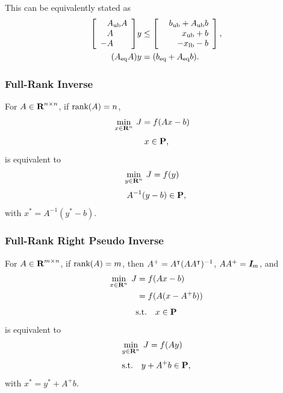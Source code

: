 \documentclass{article}
\begin{document}
        This can be equivalently stated as
    \begin{align*}
        \left[\begin{array}{l}
            \minus A_\ub A
            \\
            \minus A
            \\
            -A
        \end{array}\right]
        &y\leq
        \left[\begin{array}{r}
            \minus b_\ub+A_\ub b
            \\
            \minus x_\ub +b
            \\
            -x_\lb-b
        \end{array}\right],\\
        (A_\eq A)&y = (b_\eq+A_\eq b).
    \end{align*}

\subsubsection{Full-Rank Inverse}

    For $A\in\textbf{R}^{n\times n}$, if $\text{rank}(A)=n$,
    \begin{align*}
            \min_{x\in\textbf{R}^n}\:J
        &=
            f(A x - b)
    \end{align*}
    \begin{align*}
        x\in\textbf{P},
    \end{align*}
    is equivalent to
    \begin{align*}
        \min_{y\in\textbf{R}^n}\:J
        &=
            f(y)
    \end{align*}
    \begin{align*}
        A^{-1}(y-b)\in\textbf{P},
    \end{align*}
    with $x^*=A^{-1}(y^*-b)$.
    
\subsubsection{Full-Rank Right Pseudo Inverse}

    For $A\in\textbf{R}^{m\times n}$, if $\text{rank}(A)=m$, then
    $A^+ = A^\intercal(AA^\intercal)^{-1}$, $AA^+=\emph{\textbf{I}}_m$, and
    \begin{align*}
            \min_{x\in\textbf{R}^n}\:J
        &=
            f(A x - b)
        \\
        &=f(A (x - A^+b))
    \end{align*}
    \begin{align*}
        \text{s.t.}\quad x\in\textbf{P}
    \end{align*}
    is equivalent to
    \begin{align*}
        \min_{y\in\textbf{R}^n}\:J
    &= f(Ay)
    \end{align*}
    \begin{align*}
    \text{s.t.}\quad y+A^+b\in\textbf{P},
    \end{align*}
    with $x^*=y^*+A^+b$.  
\end{document}
